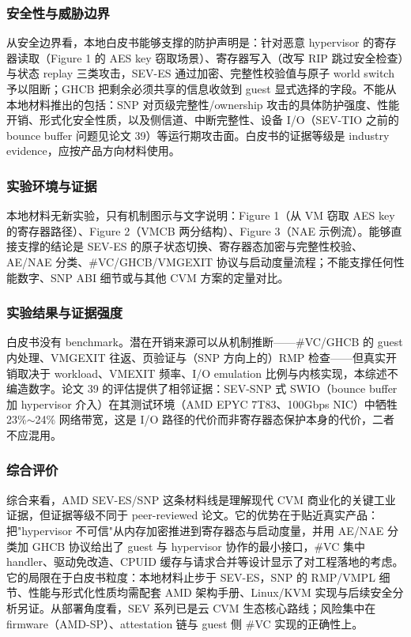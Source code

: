 \documentclass[11pt]{ctexart}
\begin{document}
\subsubsection{安全性与威胁边界}
从安全边界看，本地白皮书能够支撑的防护声明是：针对恶意 hypervisor 的寄存器读取（Figure 1 的 AES key 窃取场景）、寄存器写入（改写 RIP 跳过安全检查）与状态 replay 三类攻击，SEV-ES 通过加密、完整性校验值与原子 world switch 予以阻断；GHCB 把剩余必须共享的信息收敛到 guest 显式选择的字段。不能从本地材料推出的包括：SNP 对页级完整性/ownership 攻击的具体防护强度、性能开销、形式化安全性质，以及侧信道、中断完整性、设备 I/O（SEV-TIO 之前的 bounce buffer 问题见论文 39）等运行期攻击面。白皮书的证据等级是 industry evidence，应按产品方向材料使用。\par
\subsubsection{实验环境与证据}
本地材料无新实验，只有机制图示与文字说明：Figure 1（从 VM 窃取 AES key 的寄存器路径）、Figure 2（VMCB 两分结构）、Figure 3（NAE 示例流）。能够直接支撑的结论是 SEV-ES 的原子状态切换、寄存器态加密与完整性校验、AE/NAE 分类、\#VC/GHCB/VMGEXIT 协议与启动度量流程；不能支撑任何性能数字、SNP ABI 细节或与其他 CVM 方案的定量对比。\par
\subsubsection{实验结果与证据强度}
白皮书没有 benchmark。潜在开销来源可以从机制推断——\#VC/GHCB 的 guest 内处理、VMGEXIT 往返、页验证与（SNP 方向上的）RMP 检查——但真实开销取决于 workload、VMEXIT 频率、I/O emulation 比例与内核实现，本综述不编造数字。论文 39 的评估提供了相邻证据：SEV-SNP 式 SWIO（bounce buffer 加 hypervisor 介入）在其测试环境（AMD EPYC 7T83、100Gbps NIC）中牺牲 23\%$\sim$24\% 网络带宽，这是 I/O 路径的代价而非寄存器态保护本身的代价，二者不应混用。\par
\subsubsection{综合评价}
综合来看，AMD SEV-ES/SNP 这条材料线是理解现代 CVM 商业化的关键工业证据，但证据等级不同于 peer-reviewed 论文。它的优势在于贴近真实产品：把"hypervisor 不可信"从内存加密推进到寄存器态与启动度量，并用 AE/NAE 分类加 GHCB 协议给出了 guest 与 hypervisor 协作的最小接口，\#VC 集中 handler、驱动免改造、CPUID 缓存与请求合并等设计显示了对工程落地的考虑。它的局限在于白皮书粒度：本地材料止步于 SEV-ES，SNP 的 RMP/VMPL 细节、性能与形式化性质均需配套 AMD 架构手册、Linux/KVM 实现与后续安全分析另证。从部署角度看，SEV 系列已是云 CVM 生态核心路线；风险集中在 firmware（AMD-SP）、attestation 链与 guest 侧 \#VC 实现的正确性上。\par
\end{document}
